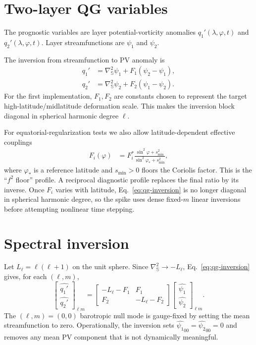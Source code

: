 \documentclass[11pt]{article}
\newcommand{\lapS}{\nabla_{\mathbb{S}}^{2}}
\begin{document}
\section{Two-layer QG variables}

The prognostic variables are layer potential-vorticity anomalies
$q_1'(\lambda,\varphi,t)$ and $q_2'(\lambda,\varphi,t)$.
Layer streamfunctions are $\psi_1$ and $\psi_2$.

The inversion from streamfunction to PV anomaly is
\begin{align}
  q_1' &= \lapS \psi_1 + F_1(\psi_2-\psi_1),\\
  q_2' &= \lapS \psi_2 + F_2(\psi_1-\psi_2).
  \label{eq:qg-inversion}
\end{align}
For the first implementation, $F_1,F_2$ are constants chosen to represent
the target high-latitude/midlatitude deformation scale.  This makes the
inversion block diagonal in spherical harmonic degree $\ell$.

For equatorial-regularization tests we also allow latitude-dependent effective
couplings
\begin{align}
  F_i(\varphi) &= F_i^\ast
  \frac{\sin^2\varphi + s_{\min}^2}
       {\sin^2\varphi_\ast + s_{\min}^2},
  \label{eq:f-squared-floor}
\end{align}
where $\varphi_\ast$ is a reference latitude and $s_{\min}>0$ floors the
Coriolis factor.  This is the ``$f^2$ floor'' profile.  A reciprocal diagnostic
profile replaces the final ratio by its inverse.  Once $F_i$ varies with
latitude, Eq.~\eqref{eq:qg-inversion} is no longer diagonal in spherical
harmonic degree, so the spike uses dense fixed-$m$ linear inversions before
attempting nonlinear time stepping.

\section{Spectral inversion}

Let $L_\ell = \ell(\ell+1)$ on the unit sphere.  Since
$\lapS \to -L_\ell$, Eq.~\eqref{eq:qg-inversion} gives, for each
$(\ell,m)$,
\begin{equation}
  \begin{bmatrix}
    \widehat{q_1'}\\
    \widehat{q_2'}
  \end{bmatrix}_{\ell m}
  =
  \begin{bmatrix}
    -L_\ell - F_1 & F_1\\
    F_2 & -L_\ell - F_2
  \end{bmatrix}
  \begin{bmatrix}
    \widehat{\psi_1}\\
    \widehat{\psi_2}
  \end{bmatrix}_{\ell m}.
  \label{eq:spectral-inversion}
\end{equation}
The $(\ell,m)=(0,0)$ barotropic null mode is gauge-fixed by setting the
mean streamfunction to zero.  Operationally, the inversion sets
$\widehat{\psi_1}_{00}=\widehat{\psi_2}_{00}=0$ and removes any mean PV
component that is not dynamically meaningful.
\end{document}
